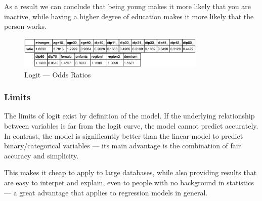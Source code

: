 As a result we can conclude that being young makes it more likely that you are inactive, while having a higher degree of education makes it more likely that the person works.

\begin{figure}
    \centering
    \includegraphics[width=0.8\textwidth]{img/logit_odds_ratios}
    \caption{Logit --- Odds Ratios}
    \label{fig:logit_odds_ratios}
\end{figure}




\subsubsection{Limits}
The limits of logit exist by definition of the model. If the underlying relationship between variables is far from the logit curve, the model cannot predict accurately. In contrast, the model is significantly better than the linear model to predict binary/categorical variables --- its main advantage is the combination of fair accuracy and simplicity.

This makes it cheap to apply to large databases, while also providing results that are easy to interpet and explain, even to people with no background in statistics --- a great advantage that applies to regression models in general.
